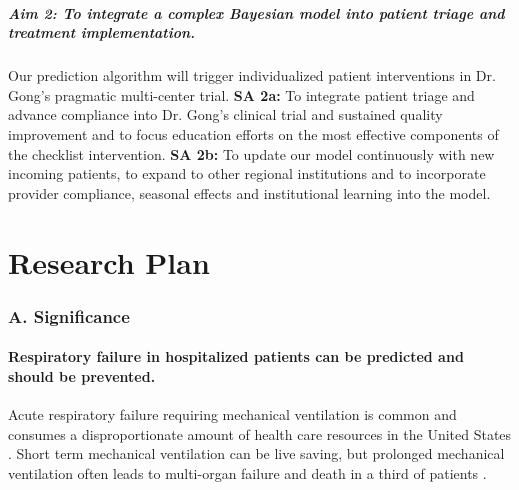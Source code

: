 \documentclass[11pt,notitlepage]{article}
\begin{document}
\subsubsection*{Aim 2: To integrate a complex Bayesian model into patient triage and treatment implementation.}
Our prediction algorithm will trigger individualized patient interventions in Dr. Gong's pragmatic multi-center trial. 
\newline \textbf{SA 2a:} To integrate patient triage and advance compliance into Dr. Gong's clinical trial and sustained quality improvement and to focus education efforts on the most effective components of the checklist intervention.
\newline \textbf{SA 2b:} To update our model continuously with new incoming patients, to expand to other regional institutions and to incorporate provider compliance, seasonal effects and institutional learning into the model.

\newpage
\part*{Research Plan}

\section*{A. Significance}

\subsection*{Respiratory failure in hospitalized patients can be predicted and should be prevented.}
Acute respiratory failure requiring mechanical ventilation is common and consumes a disproportionate amount of health care resources in the United States \cite{Wunsch_20639743}. Short term mechanical ventilation can be live saving, but prolonged mechanical ventilation often leads to multi-organ failure and death in a third of patients \cite{Wunsch_20639743, Ranieri_10872010}.
\end{document}
